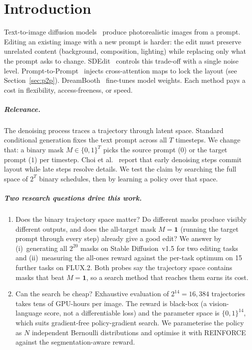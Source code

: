 \chapter{Introduction}

Text-to-image diffusion models~\cite{rombach2022high} produce photorealistic images from a prompt. Editing an existing image with a new prompt is harder: the edit must preserve unrelated content (background, composition, lighting) while replacing only what the prompt asks to change. SDEdit~\cite{meng2021sdedit} controls this trade-off with a single noise level. Prompt-to-Prompt~\cite{hertz2022prompt} injects cross-attention maps to lock the layout (see Section~\ref{sec:p2p}). DreamBooth~\cite{ruiz2023dreambooth} fine-tunes model weights. Each method pays a cost in flexibility, access-freeness, or speed.

\paragraph{Relevance.}
The denoising process traces a trajectory through latent space. Standard conditional generation fixes the text prompt across all $T$ timesteps. We change that: a binary mask $M \in \{0,1\}^T$ picks the source prompt ($0$) or the target prompt ($1$) per timestep. Choi et al.~\cite{choi2022perception} report that early denoising steps commit layout while late steps resolve details. We test the claim by searching the full space of $2^T$ binary schedules, then by learning a policy over that space.

\paragraph{Two research questions drive this work.}
\begin{enumerate}
    \item Does the binary trajectory space matter? Do different masks produce visibly different outputs, and does the all-target mask $M=\mathbf{1}$ (running the target prompt through every step) already give a good edit? We answer by (i)~generating all $2^{20}$ masks on Stable Diffusion~v1.5 for two editing tasks and (ii)~measuring the all-ones reward against the per-task optimum on 15 further tasks on FLUX.2. Both probes say the trajectory space contains masks that beat $M=\mathbf{1}$, so a search method that reaches them earns its cost.
    \item Can the search be cheap? Exhaustive evaluation of $2^{14}=16{,}384$ trajectories takes tens of GPU-hours per image. The reward is black-box (a vision-language score, not a differentiable loss) and the parameter space is $\{0,1\}^{14}$, which suits gradient-free policy-gradient search. We parameterise the policy as $N$ independent Bernoulli distributions and optimise it with REINFORCE~\cite{williams1992simple} against the segmentation-aware reward.
\end{enumerate}


